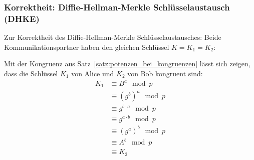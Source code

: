 \documentclass[
  a4paper,
  11pt,
]{scrartcl}
\theoremstyle{plain}
\theoremstyle{definition}
\theoremstyle{remark}
\begin{document}
\subsubsection{Korrektheit: Diffie-Hellman-Merkle Schlüsselaustausch (DHKE)}
\label{sub:dhke_proof}
Zur Korrektheit des Diffie-Hellman-Merkle Schlüsselaustausches: Beide
Kommunikationspartner haben den gleichen Schlüssel $K = K_1 = K_2$:

Mit der Kongruenz aus Satz~\ref{satz:potenzen_bei_kongruenzen} lässt sich zeigen, dass die Schlüssel $K_1$ von Alice und $K_2$ von Bob kongruent
sind:
\begin{align*}
  K_1 & \equiv B^a \mod p\\
  & \equiv {(g^b)}^a \mod p\\
  & \equiv g^{b \cdot a} \mod p\\
  & \equiv g^{a \cdot b} \mod p\\
  & \equiv {(g^a)}^b \mod p\\
  & \equiv A^b \mod p\\
  & \equiv K_2
\end{align*}
\end{document}
